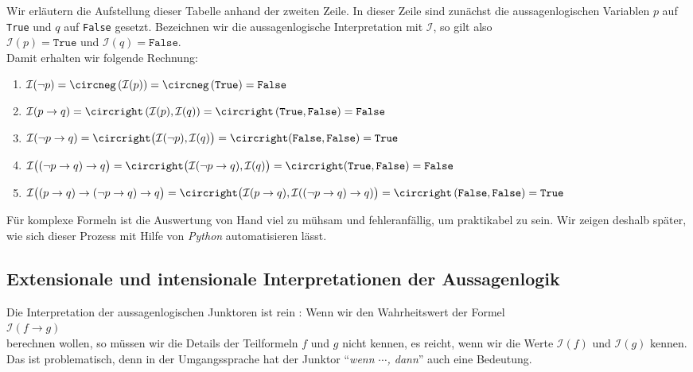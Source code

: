 Wir erläutern die Aufstellung dieser Tabelle anhand der zweiten Zeile.  In dieser Zeile sind zunächst die
aussagenlogischen Variablen $p$ auf \texttt{True} und $q$ auf \texttt{False} gesetzt.  Bezeichnen wir die
aussagenlogische Interpretation mit $\mathcal{I}$, so gilt also\\[0.2cm]
\hspace*{1.3cm} $\mathcal{I}(p) = \texttt{True}$ und $\mathcal{I}(q) = \texttt{False}$. \\[0.2cm]
Damit erhalten wir folgende Rechnung:
\begin{enumerate}
\item $\mathcal{I}(\neg p) = \circneg\,(\mathcal{I}(p)) = \circneg\,( \texttt{True}) = \texttt{False}$
\item $\mathcal{I}(p \rightarrow q) = \circright\,(\mathcal{I}(p), \mathcal{I}(q)) = \circright\,(\texttt{True}, \texttt{False}) = \texttt{False}$
\item $\mathcal{I}(\neg p \rightarrow q) = \circright\bigl( \mathcal{I}(\neg p), \mathcal{I}(q)\bigr) = \circright(\texttt{False}, \texttt{False}) = \texttt{True}$
\item $\mathcal{I}\bigl((\neg p \rightarrow q) \rightarrow q\bigr) = 
          \circright\bigl( \mathcal{I}(\neg p \rightarrow q), \mathcal{I}(q) \bigr) = 
          \circright( \texttt{True}, \texttt{False} ) = \texttt{False}$
\item $\mathcal{I}\bigl((p \rightarrow q) \rightarrow  (\neg p \rightarrow q) \rightarrow q\bigr) = 
      \circright\bigl( \mathcal{I}(p \rightarrow q),  \mathcal{I}((\neg p \rightarrow q) \rightarrow q)\bigr) = 
       \circright\,( \texttt{False},  \texttt{False} ) = \texttt{True}$
\end{enumerate}
Für komplexe Formeln ist die Auswertung von Hand viel zu mühsam und
fehleranfällig, um praktikabel zu sein.  Wir zeigen deshalb später, wie
sich dieser Prozess mit Hilfe von \textsl{Python} automatisieren lässt.

\subsection{Extensionale und intensionale Interpretationen der Aussagenlogik}
 
Die Interpretation der aussagenlogischen Junktoren ist rein :
Wenn wir den Wahrheitswert der Formel
\\[0.2cm]
\hspace*{1.3cm}
$\mathcal{I}(f \rightarrow g)$ 
\\[0.2cm]
berechnen wollen, so müssen wir die Details der Teilformeln $f$ und $g$ nicht kennen, es reicht,
wenn wir die Werte $\mathcal{I}(f)$ und $\mathcal{I}(g)$ kennen.   Das ist problematisch,
denn in der Umgangssprache hat der Junktor
``\textsl{wenn $\cdots$, dann}'' auch eine  Bedeutung.  

